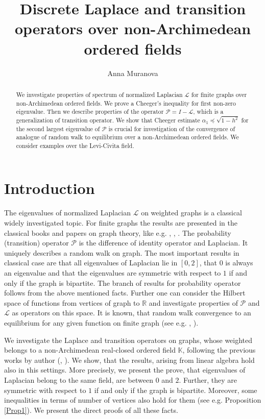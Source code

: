 \documentclass[a4paper,12pt]{amsart}
\author{Anna Muranova}
\title[Laplacian on graphs]{Discrete Laplace and transition operators over non-Archimedean ordered fields}
\theoremstyle{definition}
\renewcommand{\P}{\mathcal{P}}
\newcommand{\K}{\mathbb{K}}
\renewcommand{\L}{\mathcal{L}}
\begin{document}
                         
\maketitle

\medskip
    \begin{abstract}

We investigate properties of spectrum of normalized Laplacian $\L$ for finite graphs over non-Archimedean ordered fields. We prove a Cheeger's inequality for first non-zero eigenvalue. Then we describe properties of the operator $\P=I-\L$, which is a generalization of transition operator. We show that Cheeger estimate $\alpha_1\preceq \sqrt{1-h^2}$ for the second largest eigenvalue of $\P$ is crucial for investigation of the convergence of analogue of random walk to equilibrium over a non-Archimedean ordered fields. We consider examples over the Levi-Civita field.
    \end{abstract}

\section{Introduction}


The eigenvalues of normalized Laplacian $\mathcal L$ on weighted graphs is a classical widely investigated topic.
For finite graphs the results are presented in the classical books and papers on graph theory, like e.g. \cite{BauerJost}, \cite{Chung}, \cite{Grigoryan}. The probability (transition) operator $\P$ is the difference of identity operator and Laplacian. It uniquely describes a random walk on graph. The most important results in classical case are that all eigenvalues of Laplacian lie in $[0,2]$, that $0$ is always an eigenvalue and that the eigenvalues are symmetric with respect to $1$ if and only if the graph is bipartite. The branch of results for probability operator follows from the above mentioned facts. Further one can consider the Hilbert space of functions from vertices of graph to $\mathbb R$ and investigate properties of $\P$ and $\L$ as operators on this space. It is known, that random walk convergence to an equilibrium for any given function on finite graph (see e.g. \cite{Chung}, \cite{Grigoryan}).

We investigate the Laplace and transition operators on graphs, whose weighted belongs to a non-Archimedean real-closed ordered field $\K$, following the previous works by author (\cite{Muranova1}, \cite{Muranova2}). We show, that the results, arising from linear algebra hold also in this settings. More precisely, we present the prove, that eigenvalues of Laplacian belong to the same field, are between $0$ and $2$. Further, they are symmetric with respect to $1$ if and only if the graph is bipartite.
Moreover, some inequalities in terms of number of vertices also hold for them (see e.g. Proposition \ref{Prop1}). We present the direct  proofs of all these facts.
\end{document}
